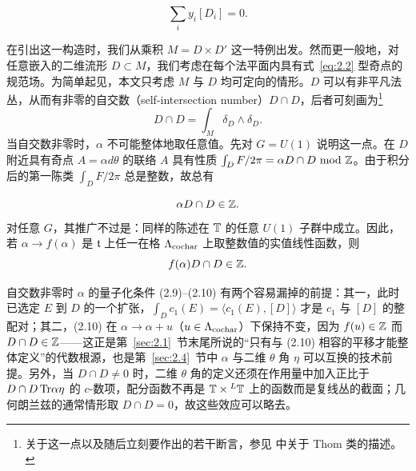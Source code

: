 \setcounter{equation}{6}
\begin{equation}\label{eq:2.7}
  \sum_iy_i[D_i]=0.
\end{equation}



\bigskip{}

在引出这一构造时，我们从乘积 $M=D\times D'$ 这一特例出发。然而更一般地，对任意嵌入的二维流形 $D\subset M$，我们考虑在每个法平面内具有式~\eqref{eq:2.2} 型奇点的规范场。为简单起见，本文只考虑 $M$ 与 $D$ 均可定向的情形。$D$ 可以有非平凡法丛，从而有非零的自交数（self-intersection number）$D\cap D$，后者可刻画为\footnote{关于这一点以及随后立刻要作出的若干断言，参见 \cite{ref40} 中关于 Thom 类的描述。}
\setcounter{equation}{7}
\begin{equation}\label{eq:2.8}
  D\cap D
=\int_M\delta_D\wedge \delta_D.
\end{equation}
 当自交数非零时，$\alpha$ 不可能整体地取任意值。先对 $G=U(1)$ 说明这一点。在 $D$ 附近具有奇点 $A=\alpha d\theta$ 的联络 $A$ 具有性质 $\int_D F/2\pi = \alpha D\cap D~{\rm mod}~{\mathbb{Z}}$。由于积分后的第一陈类 $\int_D F/2\pi$ 总是整数，故总有

\setcounter{equation}{8}
\begin{equation}\label{eq:2.9}
  \alpha D\cap D\in {\mathbb{Z}}.
\end{equation}
 对任意 $G$，其推广不过是：同样的陈述在 ${\mathbb{T}}$ 的任意 $U(1)$ 子群中成立。因此，若 $\alpha\to f(\alpha)$ 是 $\mathfrak t$ 上任一在格 $\Lambda_{\rm cochar}$ 上取整数值的实值线性函数，则
\setcounter{equation}{9}
\begin{equation}\label{eq:2.10}
  f(\alpha) D\cap D\in{\mathbb{Z}}.
\end{equation}
\begin{yizhu}[易错点]
自交数非零时 $\alpha$ 的量子化条件 (2.9)--(2.10) 有两个容易漏掉的前提：其一，此时已选定 $E$ 到 $D$ 的一个扩张，$\int_D c_1(E)=\langle c_1(E),[D]\rangle$ 才是 $c_1$ 与 $[D]$ 的整配对；其二，(2.10) 在 $\alpha\to\alpha+u$（$u\in\Lambda_{\rm cochar}$）下保持不变，因为 $f(u)\in{\mathbb{Z}}$ 而 $D\cap D\in{\mathbb{Z}}$——这正是第~\ref{sec:2.1}~节末尾所说的“只有与 (2.10) 相容的平移才能整体定义”的代数根源，也是第~\ref{sec:2.4}~节中 $\alpha$ 与二维 $\theta$ 角 $\eta$ 可以互换的技术前提。另外，当 $D\cap D\ne0$ 时，二维 $\theta$ 角的定义还须在作用量中加入正比于 $D\cap D\,{\rm Tr}\alpha\eta$ 的 $c$-数项，配分函数不再是 ${\mathbb{T}}\times{}^L{\mathbb{T}}$ 上的函数而是复线丛的截面；几何朗兰兹的通常情形取 $D\cap D=0$，故这些效应可以略去。
\end{yizhu}

